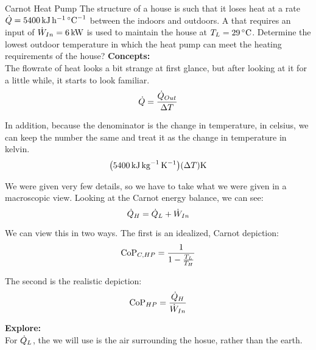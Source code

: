\begin{example}{Carnot Heat Pump}
  The structure of a house is such that it loses heat at a rate $\FlowRate{\Heat} = \SI{5400}{\kilo\joule\per\hour\per\degreeCelsius}$ between the indoors and outdoors.
  A  that requires an input of $\dot{W}_{In} = \SI{6}{\kilo\watt}$ is used to maintain the house at $\Temp_{L} = \SI{29}{\degreeCelsius}$.
  Determine the lowest outdoor temperature in which the heat pump can meet the heating requirements of the house?
  \tcblower{}
  \textbf{Concepts:} \\
  The flowrate of heat looks a bit strange at first glance, but after looking at it for a little while, it starts to look familiar.
  \begin{equation*}
    \dot{Q} = \frac{\dot{Q}_{Out}}{\Delta T}
  \end{equation*}

  In addition, because the denominator is the change in temperature, in celsius, we can keep the number the same and treat it as the change in temperature in kelvin.
  \begin{equation*}
    \bigl( \SI{5400}{\kilo\joule\per\kilo\gram\per\kelvin} \bigr) (\Delta T) \si{\kelvin}
  \end{equation*}

  We were given very few details, so we have to take what we were given in a macroscopic view.
  Looking at the Carnot energy balance, we can see:
  \begin{equation*}
    \dot{Q}_{H} = \dot{Q}_{L} + \dot{W}_{In}
  \end{equation*}

  We can view this  in two ways.
  The first is an idealized, Carnot depiction:
  \begin{equation*}
    \text{CoP}_{C, HP} = \frac{1}{1- \frac{T_{L}}{T_{H}}}
  \end{equation*}

  The second is the realistic depiction:
  \begin{equation*}
    \text{CoP}_{HP} = \frac{\dot{Q}_{H}}{\dot{W}_{In}}
  \end{equation*}

  \textbf{Explore:} \\
  For $\dot{Q}_{L}$, the  we will use is the air surrounding the hosue, rather than the earth.


\end{example}
